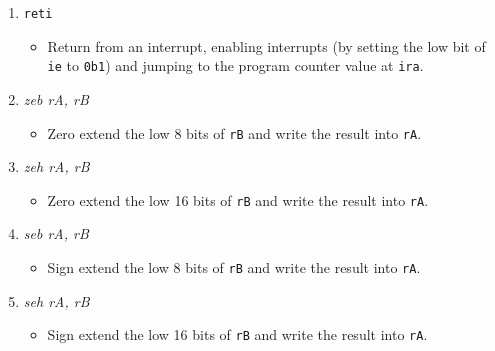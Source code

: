 \documentclass{article}
\begin{document}
\begin{itemize}
\begin{enumerate}
			\item \texttt{reti}
				\begin{itemize}
				\item Return from an interrupt, enabling interrupts
					(by setting the low bit of \texttt{ie} to \texttt{0b1})
					and jumping to the program counter value at
					\texttt{ira}.
				\end{itemize}


			\item \textit{zeb rA, rB}
				\begin{itemize}
				\item Zero extend the low 8 bits of \texttt{rB} and write
					the result into \texttt{rA}.
				\end{itemize}
			\item \textit{zeh rA, rB}
				\begin{itemize}
				\item Zero extend the low 16 bits of \texttt{rB} and write
					the result into \texttt{rA}.
				\end{itemize}
			\item \textit{seb rA, rB}
				\begin{itemize}
				\item Sign extend the low 8 bits of \texttt{rB} and write
					the result into \texttt{rA}.
				\end{itemize}
			\item \textit{seh rA, rB}
				\begin{itemize}
				\item Sign extend the low 16 bits of \texttt{rB} and write
					the result into \texttt{rA}.
				\end{itemize}
			\end{enumerate}
		\end{itemize}
\end{document}
